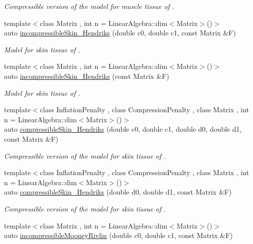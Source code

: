 \begin{DoxyCompactItemize}
\begin{DoxyCompactList}\small\item\em Compressible version of the model for muscle tissue of \cite{Martins1998}. \end{DoxyCompactList}\item 
{\footnotesize template$<$class Matrix , int n = Linear\-Algebra\-::dim$<$\-Matrix$>$()$>$ }\\auto \hyperlink{group__Biomechanics_gaa20bf15ef6976d64d89490429035b2c4}{incompressible\-Skin\-\_\-\-Hendriks} (double c0, double c1, const Matrix \&F)
\begin{DoxyCompactList}\small\item\em Model for skin tissue of \cite{Hendriks2005}. \end{DoxyCompactList}\item 
{\footnotesize template$<$class Matrix , int n = Linear\-Algebra\-::dim$<$\-Matrix$>$()$>$ }\\auto \hyperlink{group__Biomechanics_gad8653218bd2afb4e3cfd601a5142956c}{incompressible\-Skin\-\_\-\-Hendriks} (const Matrix \&F)
\begin{DoxyCompactList}\small\item\em Model for skin tissue of \cite{Hendriks2005}. \end{DoxyCompactList}\item 
{\footnotesize template$<$class Inflation\-Penalty , class Compression\-Penalty , class Matrix , int n = Linear\-Algebra\-::dim$<$\-Matrix$>$()$>$ }\\auto \hyperlink{group__Biomechanics_ga07b4c52c6ecf7e72f73ab5832fb262cd}{compressible\-Skin\-\_\-\-Hendriks} (double c0, double c1, double d0, double d1, const Matrix \&F)
\begin{DoxyCompactList}\small\item\em Compressible version of the model for skin tissue of \cite{Hendriks2005}. \end{DoxyCompactList}\item 
{\footnotesize template$<$class Inflation\-Penalty , class Compression\-Penalty , class Matrix , int n = Linear\-Algebra\-::dim$<$\-Matrix$>$()$>$ }\\auto \hyperlink{group__Biomechanics_ga42721e772b7eada1b0bca98247ad440f}{compressible\-Skin\-\_\-\-Hendriks} (double d0, double d1, const Matrix \&F)
\begin{DoxyCompactList}\small\item\em Compressible version of the model for skin tissue of \cite{Hendriks2005}. \end{DoxyCompactList}\item 
\hypertarget{group__Rubber_gace19173e33490aadd36ae3a03fd1d85c}{{\footnotesize template$<$class Matrix , int n = Linear\-Algebra\-::dim$<$\-Matrix$>$()$>$ }\\auto \hyperlink{group__Rubber_gace19173e33490aadd36ae3a03fd1d85c}{incompressible\-Mooney\-Rivlin} (double c0, double c1, const Matrix \&F)}\label{group__Rubber_gace19173e33490aadd36ae3a03fd1d85c}


\end{DoxyCompactItemize}

